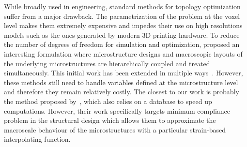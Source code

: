 While broadly used in engineering, standard methods for topology optimization suffer from a major drawback.
The parametrization of the problem at the voxel level makes them extremely expensive and impedes their use on high resolutions models such as the ones generated by modern 3D printing hardware.
To reduce the number of degrees of freedom for simulation and optimization, \citet{rodrigues:2002:h} proposed an interesting formulation where microstructure designs 
and macroscopic layouts of the underlying microstructures are hierarchically coupled and treated simultaneously.
This initial work has been extended in multiple ways~\citep{coelho:2008:h,nakshatrala:2013:non,yan:2014:concurrent,xia:2014:reduced}.
However, these methods still need to handle variables defined at
the microstructure level and therefore they remain relatively costly.
The closest to our work is probably the method proposed by~\citet{xia:2015:multiscale},
which also relies on a database to speed up computations.
However, their work specifically targets minimum compliance problem in the structural design which allows them to approximate the macroscale behaviour of the microstructures with a
particular strain-based interpolating function.
